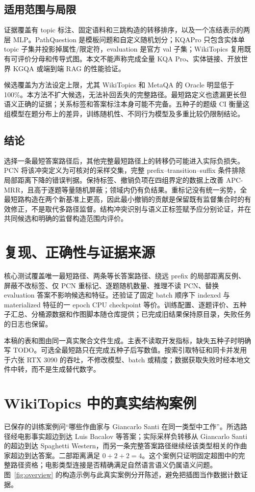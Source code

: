 \documentclass[UTF8,a4paper,10pt,fontset=fandol]{ctexart}
\begin{document}
\subsection{适用范围与局限}
证据覆盖有 topic 标注、固定语料和三跳构造的转移排序，以及一个冻结表示的两层 MLP。PathQuestion 是模板问题和自定义随机划分；KQAPro 只包含实体单 topic 子集并投影掉属性/限定符，evaluation 是官方 val 子集；WikiTopics 复用既有可评价分母和传导式图。本文不能声称完成全量 KQA Pro、实体链接、开放世界 KGQA 或端到端 RAG 的性能验证。

候选覆盖为方法设定上限，尤其 WikiTopics 和 MetaQA 的 Oracle 明显低于 100\%。本方法不扩大候选，无法补回丢失的完整路径。最短路定义也遗漏更长但语义正确的证据；关系标签和答案标注本身可能不完备。五种子的题级 CI 衡量这组模型在题分布上的差异，训练随机性、不同行为模型及多重比较仍限制结论。

\subsection{结论}
选择一条最短答案路径后，其他完整最短路径上的转移仍可能进入实际负损失。PCN 将该冲突定义为可核对的采样交集，完整 prefix--transition--suffix 条件排除局部距离下降的错误判据。保持标签、撤销负项在四组界定的数据上改善 APC-MRR，且高于逐题等量随机屏蔽；领域内仍有负结果。重标记没有统一劣势，全最短路构造在两个新基准上更高，因此最小撤销的贡献是保留既有监督集合时的有效修正，不是取代多路径监督。结构冲突识别与语义正标签赋予应分别论证，并在共同候选和明确的监督构造范围内评价。

\appendix
\section{复现、正确性与证据来源}
核心测试覆盖唯一最短路径、两条等长答案路径、绕远 prefix 的局部距离反例、屏蔽不改标签、仅 PCN 重标记、逐题随机数量、推理不读 PCN、替换 evaluation 答案不影响候选和特征。还验证了固定 batch 顺序下 indexed 与 materialized 特征的一 epoch CPU checkpoint 等价。训练配置、逐题评价、五种子汇总、分桶源数据和作图脚本随仓库提供；已完成旧结果保持原目录，失败任务的日志也保留。

本稿的表和图由同一真实聚合文件生成。主表不读取开发指标，缺失五种子时明确写 TODO。可选全最短路只在完成五种子后写数值。按索引取特征和同卡并发用于六张 RTX 3090 的吞吐，不修改模型、batch 或精度；数据获取失败时经本地文件中转，而不是生成替代数字。

\section{WikiTopics 中的真实结构案例}
已保存的训练案例问“哪些作曲家与 Giancarlo Santi 在同一类型中工作”。所选路径经电影事实超边到达 Luis Bacalov 等答案；实际采样负转移从 Giancarlo Santi 的超边到达 Spaghetti Western，而另一条完整答案路径继续经该类型相关的作曲家超边到达答案。二部距离满足 $0+2+2=4$。这个案例只证明固定超图中的完整路径资格；电影类型连接是否精确满足自然语言语义仍属语义问题。图~\ref{fig:overview} 的构造示例与此真实案例分开陈述，避免把插图当作数据计数证据。
\end{document}
